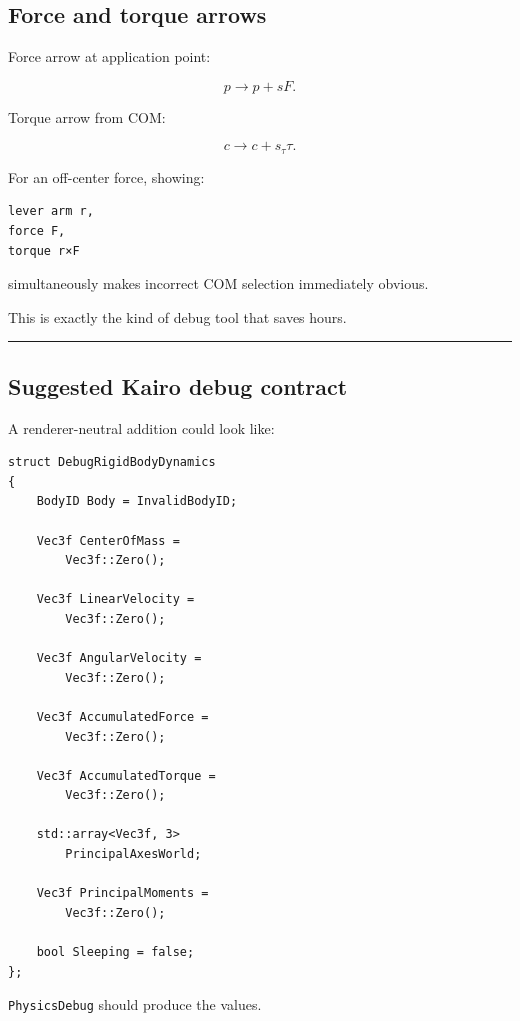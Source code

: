 \subsection{Force and torque arrows}\label{06-engine-ii-ch039-force-and-torque-arrows}

Force arrow at application point:

\[
p\rightarrow p+sF.
\]

Torque arrow from COM:

\[
c\rightarrow c+s_\tau\tau.
\]

For an off-center force, showing:

\begin{verbatim}
lever arm r,
force F,
torque r×F
\end{verbatim}

simultaneously makes incorrect COM selection immediately obvious.

This is exactly the kind of debug tool that saves hours.

\begin{center}\rule{0.5\linewidth}{0.5pt}\end{center}

\subsection{Suggested Kairo debug contract}\label{06-engine-ii-ch039-suggested-kairo-debug-contract}

A renderer-neutral addition could look like:

\begin{verbatim}
struct DebugRigidBodyDynamics
{
    BodyID Body = InvalidBodyID;

    Vec3f CenterOfMass =
        Vec3f::Zero();

    Vec3f LinearVelocity =
        Vec3f::Zero();

    Vec3f AngularVelocity =
        Vec3f::Zero();

    Vec3f AccumulatedForce =
        Vec3f::Zero();

    Vec3f AccumulatedTorque =
        Vec3f::Zero();

    std::array<Vec3f, 3>
        PrincipalAxesWorld;

    Vec3f PrincipalMoments =
        Vec3f::Zero();

    bool Sleeping = false;
};
\end{verbatim}

\texttt{PhysicsDebug} should produce the values.

